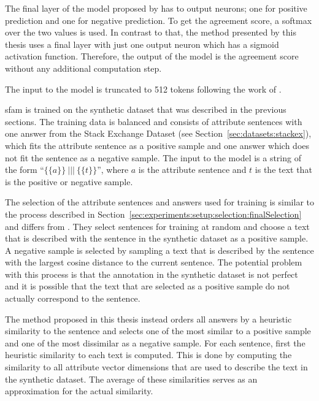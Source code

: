 The final layer of the model proposed by \citet{patelLearningInterpretableStyle2023} has to output neurons; one for positive prediction and one for negative prediction. To get the agreement score, a softmax over the two values is used. In contrast to that, the method presented by this thesis uses a final layer with just one output neuron which has a sigmoid activation function. Therefore, the output of the model is the agreement score without any additional computation step.

The input to the model is truncated to 512 tokens following the work of \citet{patelLearningInterpretableStyle2023}.

\acs{sfam} is trained on the synthetic dataset that was described in the previous sections. The training data is balanced and consists of attribute sentences with one answer from the Stack Exchange Dataset (see Section~\ref{sec:datasets:stackex}), which fits the attribute sentence as a positive sample and one answer which does not fit the sentence as a negative sample. The input to the model is a string of the form \enquote{\(\{\{a\}\}~|||~\{\{t\}\}\)}, where \(a\) is the attribute sentence and \(t\) is the text that is the positive or negative sample.

The selection of the attribute sentences and answers used for training is similar to the process described in Section~\ref{sec:experiments:setup:selection:finalSelection} and differs from \citet{patelLearningInterpretableStyle2023}. They select sentences for training at random and choose a text that is described with the sentence in the synthetic dataset as a positive sample. A negative sample is selected by sampling a text that is described by the sentence with the largest cosine distance to the current sentence.
The potential problem with this process is that the annotation in the synthetic dataset is not perfect and it is possible that the text that are selected as a positive sample do not actually correspond to the sentence.

The method proposed in this thesis instead orders all answers by a heuristic similarity to the sentence and selects one of the most similar to a positive sample and one of the most dissimilar as a negative sample. For each sentence, first the heuristic similarity to each text is computed. This is done by computing the similarity to all attribute vector dimensions that are used to describe the text in the synthetic dataset. The average of these similarities serves as an approximation for the actual similarity.

